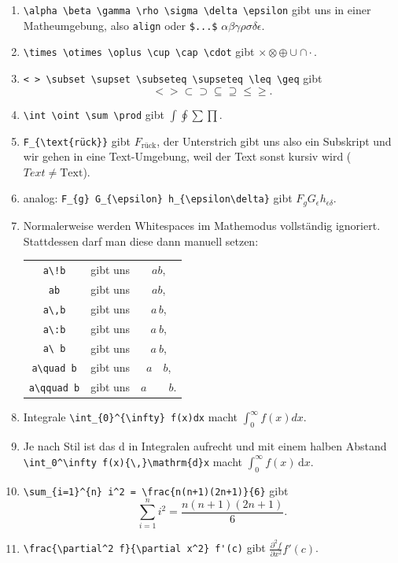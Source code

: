 \documentclass[a4paper]{article}
\begin{document}
\begin{enumerate}
  \item \verb|\alpha \beta \gamma \rho \sigma \delta \epsilon| gibt uns in
    einer Matheumgebung, also \verb|align| oder \verb|$...$|
    $\alpha \beta \gamma \rho \sigma \delta \epsilon$.
  \item \verb|\times \otimes \oplus \cup \cap \cdot| gibt $\times \otimes
    \oplus \cup \cap \cdot$.
  \item \verb|< > \subset \supset \subseteq \supseteq \leq \geq| gibt 
    \begin{equation}
      < > \subset \supset \subseteq \supseteq \leq \geq.
    \end{equation}
  \item \verb|\int \oint \sum \prod| gibt $\int \oint \sum \prod$.
  \item \verb|F_{\text{rück}}| gibt $F_{\text{rück}}$, der Unterstrich gibt uns
    also ein Subskript und wir gehen in eine Text-Umgebung, weil der Text sonst
    kursiv wird ($Text\neq \text{Text} $).
  \item analog: \verb|F_{g} G_{\epsilon} h_{\epsilon\delta}| gibt $F_{g}
    G_{\epsilon} h_{\epsilon\delta}$.
  \item Normalerweise werden Whitespaces im Mathemodus vollständig ignoriert.
    Stattdessen darf man diese dann manuell setzen:
    \begin{center}
      \begin{tabular}{ccc}
        \verb|a\!b|      & gibt uns & $a\!b$, \\
        \verb|ab|        & gibt uns & $ab$, \\
        \verb|a\,b|      & gibt uns & $a\,b$, \\
        \verb|a\:b|      & gibt uns & $a\:b$, \\
        \verb|a\ b|      & gibt uns & $a\ b$, \\
        \verb|a\quad b|  & gibt uns & $a\quad b$, \\
        \verb|a\qquad b| & gibt uns & $a\qquad b$. \\
      \end{tabular}
    \end{center}
  \item Integrale \verb|\int_{0}^{\infty} f(x)dx| macht $\int_{0}^{\infty}
    f(x)dx$.
  \item Je nach Stil ist das d in Integralen aufrecht und mit einem halben
    Abstand \verb|\int_0^\infty f(x){\,}\mathrm{d}x| macht $\int_0^\infty
    f(x)\,\text{d}x$.
  \item \verb|\sum_{i=1}^{n} i^2 = \frac{n(n+1)(2n+1)}{6}| gibt 
    \begin{equation}
      \sum_{i=1}^n i^2 = \frac{n(n+1)(2n+1)}{6}.
    \end{equation}
  \item \verb|\frac{\partial^2 f}{\partial x^2} f'(c)| gibt $\frac{\partial^2
    f}{\partial x^2}f'(c)$.
\end{enumerate}
\end{document}
